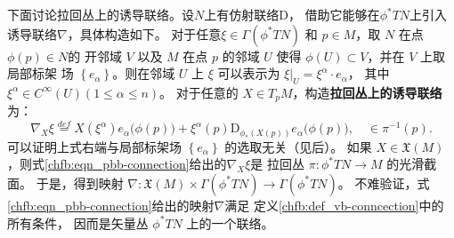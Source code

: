 下面讨论{\kaishu 拉回丛上的诱导联络}。设$N$上有仿射联络$\mathrm{D}$， 
借助它能够在$\phi^* T N$上引入诱导联络$\nabla$，具体构造如下。
对于任意$\xi \in \Gamma(\phi^* T N)$ 和 $p \in M$，取 $N$ 在点 $\phi(p) \in N$的
开邻域 $V$ 以及 $M$ 在点 $p$ 的邻域 $U$ 使得 $\phi(U) \subset V$，并在 $V$ 上取局部标架
场 $\left\{e_\alpha\right\}$。则在邻域 $U$ 上 $\xi$ 可以表示为
$\xi |_U=\xi^\alpha \cdot e_\alpha$，
其中$\xi^\alpha \in C^{\infty}(U)(1 \leqslant \alpha \leqslant n)$。
对于任意的 $X \in T_p M$，构造\textbf{拉回丛上的诱导联络}为：
\begin{equation}\label{chfb:eqn_pbb-connection}
    \nabla_X \xi \overset{def}{=} X(\xi^\alpha ) e_\alpha\bigl(\phi(p)\bigr)+\xi^\alpha(p) 
    \mathrm{D}_{\phi_*(X(p))} e_\alpha\bigl(\phi(p)\bigr), \quad \in \pi^{-1}(p) .
\end{equation}
可以证明上式右端与局部标架场 $\left\{e_\alpha\right\}$ 的选取无关（见后）。
如果 $X \in \mathfrak{X}(M)$，则式\eqref{chfb:eqn_pbb-connection}给出的$\nabla_X \xi$是
拉回丛 $\pi: \phi^* T N \rightarrow M$ 的光滑截面。
于是，得到映射 $\nabla: \mathfrak{X}(M) \times \Gamma\left(\phi^* T N\right) 
\rightarrow \Gamma\left(\phi^* T N\right)$。
不难验证，式\eqref{chfb:eqn_pbb-connection}给出的映射$\nabla$满足
定义\ref{chfb:def_vb-conncection}中的所有条件，
因而是矢量丛 $\phi^* T N$ 上的一个联络。



